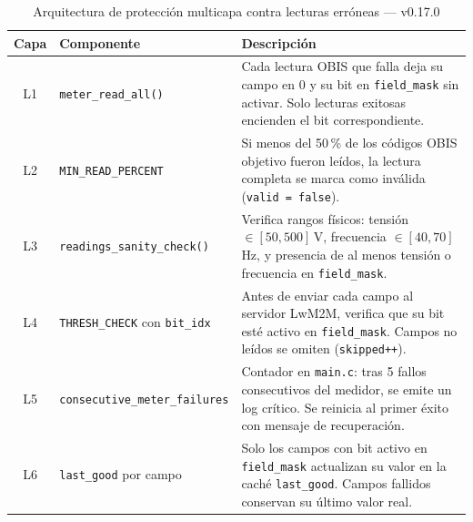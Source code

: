 
\begin{table}[htbp]
\centering
\caption{Arquitectura de protección multicapa contra lecturas erróneas — v0.17.0}
\label{tab:protection-layers-v017}
\begin{tabular}{c l p{7cm}}
\toprule
\textbf{Capa} & \textbf{Componente} & \textbf{Descripción} \\
\midrule
L1 & \texttt{meter\_read\_all()}
   & Cada lectura OBIS que falla deja su campo en 0 y su bit
     en \texttt{field\_mask} sin activar. Solo lecturas exitosas
     encienden el bit correspondiente. \\
\addlinespace
L2 & \texttt{MIN\_READ\_PERCENT}
   & Si menos del 50\,\% de los códigos OBIS objetivo fueron
     leídos, la lectura completa se marca como inválida
     (\texttt{valid = false}). \\
\addlinespace
L3 & \texttt{readings\_sanity\_check()}
   & Verifica rangos físicos: tensión $\in [50, 500]$\,V,
     frecuencia $\in [40, 70]$\,Hz, y presencia de al menos
     tensión o frecuencia en \texttt{field\_mask}. \\
\addlinespace
L4 & \texttt{THRESH\_CHECK} con \texttt{bit\_idx}
   & Antes de enviar cada campo al servidor LwM2M, verifica
     que su bit esté activo en \texttt{field\_mask}. Campos
     no leídos se omiten (\texttt{skipped++}). \\
\addlinespace
L5 & \texttt{consecutive\_meter\_failures}
   & Contador en \texttt{main.c}: tras 5 fallos consecutivos
     del medidor, se emite un log crítico. Se reinicia
     al primer éxito con mensaje de recuperación. \\
\addlinespace
L6 & \texttt{last\_good} por campo
   & Solo los campos con bit activo en \texttt{field\_mask}
     actualizan su valor en la caché \texttt{last\_good}.
     Campos fallidos conservan su último valor real. \\
\bottomrule
\end{tabular}
\end{table}
